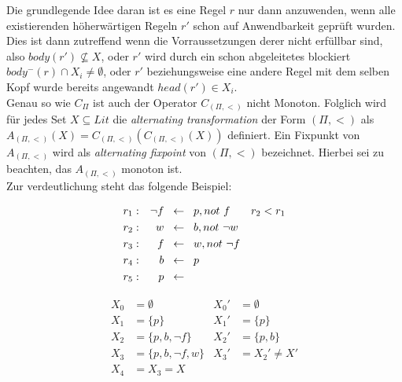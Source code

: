 Die grundlegende Idee daran ist es eine Regel $r$ nur dann anzuwenden, wenn alle
existierenden höherwärtigen Regeln $r'$ schon auf Anwendbarkeit geprüft wurden.
Dies ist dann zutreffend wenn die Vorraussetzungen derer nicht erfüllbar sind, also
$body(r') \not\subseteq X$, oder $r'$ wird durch ein schon abgeleitetes blockiert
$body^-(r) \cap X_i \neq \emptyset$, oder $r'$ beziehungsweise eine andere Regel mit
dem selben Kopf wurde bereits angewandt $head(r') \in X_i$.\\
Genau so wie $C_\Pi$ ist auch der Operator $C_{(\Pi, <)}$ nicht Monoton.
Folglich wird für jedes Set $X \subseteq Lit$ die \emph{alternating transformation}
der Form $(\Pi, <)$ als $A_{(\Pi, <)}(X) = C_{(\Pi, <)}(C_{(\Pi, <)}(X))$ definiert.
Ein Fixpunkt von $A_{(\Pi, <)}$ wird als \emph{alternating fixpoint} von $(\Pi, <)$
bezeichnet. Hierbei sei zu beachten, das $A_{(\Pi, <)}$ monoton ist.\\



Zur verdeutlichung steht das folgende Beispiel:\\
  \begin{example}[$\Pi_2, <$]
    \begin{align*}
      r_1: && \neg f \hspace*{0.2cm}&\leftarrow \hspace*{0.2cm}p, not~f &  r_2 < r_1\\
      r_2: && w \hspace*{0.2cm}&\leftarrow \hspace*{0.2cm}b, not~\neg w \\
      r_3: && f \hspace*{0.2cm}&\leftarrow \hspace*{0.2cm}w, not~\neg f \\
      r_4: && b \hspace*{0.2cm}&\leftarrow \hspace*{0.2cm}p \\
      r_5: && p \hspace*{0.2cm}&\leftarrow
    \end{align*}
    \label{example:pi2}
  \end{example}



\begin{align*}
  X_0 &= \emptyset           & X_0' &= \emptyset \\
  X_1 &= \{p\}               & X_1' &= \{p\} \\
  X_2 &= \{p, b, \neg f\}    & X_2' &= \{p, b\} \\
  X_3 &= \{p, b, \neg f, w\} & X_3' &= X_2' \not = X' \\
  X_4 &= X_3 = X
\end{align*}








